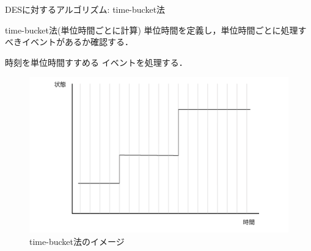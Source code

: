 \documentclass[dvipdfmx,uplatex,11pt]{beamer}
\theoremstyle{definition}
\begin{document}
\begin{frame}{DESに対するアルゴリズム: time-bucket法}
  \begin{block}{time-bucket法(単位時間ごとに計算)}
    単位時間を定義し，単位時間ごとに処理すべきイベントがあるか確認する．
    \begin{algorithmic}[1]
      \STATE 時刻を単位時間すすめる
        \STATE イベントを処理する．
      \ENDIF
      \ENDWHILE
    \end{algorithmic}
  \end{block}

  \begin{figure}[htb]
    \includegraphics[scale=0.25]{continuous_sim_time_bucket.png}
    \caption{time-bucket法のイメージ}
  \end{figure}

\end{frame}

\end{document}
